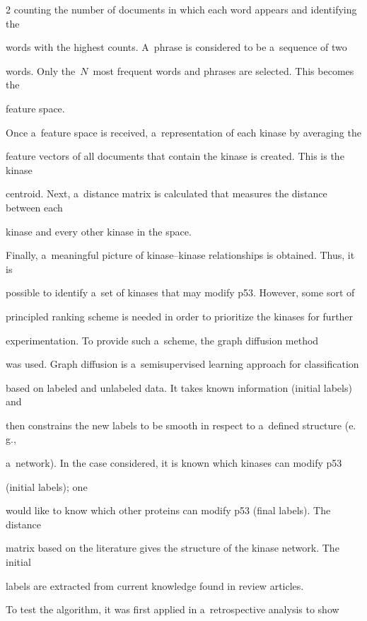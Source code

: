 \begin{multicols}{2}
counting the number of documents in which each word appears and identifying the


words with the highest counts.  A~phrase is considered to be a~sequence of two


words. Only the~$N$~most frequent words and phrases are selected. This becomes the


feature space.





  Once a~feature space is received, a~representation of each kinase by averaging the


feature vectors of all documents that contain the kinase is created. This is the kinase


centroid. Next, a~distance matrix is calculated that measures the distance between each


kinase and every other kinase in the space.





  Finally, a~meaningful picture of kinase--kinase relationships is obtained.  Thus, it is


possible to identify a~set of kinases that may modify p53. However, some sort of


principled ranking scheme is needed in order to prioritize the kinases for further


experimentation. To provide such a~scheme, the graph diffusion method~\cite{78-kl}


was used. Graph diffusion is a~semisupervised learning approach for classification


based on labeled and unlabeled data. It takes known information (initial labels) and


then constrains the new labels to be smooth in respect to a~defined structure (e.\,g.,


a~network). In the case considered, it is known which kinases can modify p53


(initial labels); one


would like to know which other proteins can modify p53 (final labels). The distance


matrix based on the literature gives the structure of the kinase network. The initial


labels are extracted from current knowledge found in review articles.





  To test the algorithm, it was first applied in a~retrospective analysis to show



\end{multicols}
